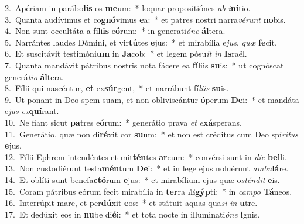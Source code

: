 {2.~}Apériam in parábo\textbf{lis} os \textbf{me}um:~* loquar propositiónes \textit{ab} \textit{i}\textbf{ní}tio.\\
{3.~}Quanta audívimus et co\textbf{gnó}vimus \textbf{e}a:~* et patres nostri narra\textit{vé}\textit{runt} \textbf{no}bis.\\
{4.~}Non sunt occultáta a fíli\textbf{is} e\textbf{ó}rum:~* in generati\textit{ó}\textit{ne} \textbf{ál}tera.\\
{5.~}Narrántes laudes Dómini, et vir\textbf{tú}tes \textbf{e}jus:~* et mirabília e\textit{jus}, \textit{quæ} \textbf{fe}cit.\\
{6.~}Et suscitávit testimóni\textbf{um} in \textbf{Ja}cob:~* et legem pósu\textit{it} \textit{in} \textbf{Is}raël.\\
{7.~}Quanta mandávit pátribus nostris nota fácere ea \textbf{fí}liis \textbf{su}is:~* ut cognóscat generá\textit{ti}\textit{o} \textbf{ál}tera.\\
{8.~}Fílii qui nascéntur, \textbf{et} ex\textbf{súr}gent,~* et narrábunt fí\textit{li}\textit{is} \textbf{su}is.\\
{9.~}Ut ponant in Deo spem suam, et non obliviscántur \textbf{ó}perum \textbf{De}i:~* et mandáta e\textit{jus} \textit{ex}\textbf{quí}rant.\\
{10.~}Ne fiant sicut \textbf{pa}tres e\textbf{ó}rum:~* generátio prava \textit{et} \textit{e}\textbf{xá}sperans.\\
{11.~}Generátio, quæ non di\textbf{ré}xit cor \textbf{su}um:~* et non est créditus cum Deo spí\textit{ri}\textit{tus} \textbf{e}jus.\\
{12.~}Fílii Ephrem intendéntes et mit\textbf{tén}tes \textbf{ar}cum:~* convérsi sunt in \textit{di}\textit{e} \textbf{bel}li.\\
{13.~}Non custodiérunt testa\textbf{mén}tum \textbf{De}i:~* et in lege ejus noluérunt \textit{am}\textit{bu}\textbf{lá}re.\\
{14.~}Et oblíti sunt benefa\textbf{ctó}rum \textbf{e}jus:~* et mirabílium ejus quæ o\textit{stén}\textit{dit} \textbf{e}is.\\
{15.~}Coram pátribus eórum fecit mirabília in \textbf{ter}ra Æ\textbf{gýp}ti:~* in \textit{cam}\textit{po} \textbf{Tá}neos.\\
{16.~}Interrúpit mare, et per\textbf{dú}xit \textbf{e}os:~* et státuit aquas qua\textit{si} \textit{in} \textbf{u}tre.\\
{17.~}Et dedúxit eos in \textbf{nu}be di\textbf{é}i:~* et tota nocte in illuminati\textit{ó}\textit{ne} \textbf{i}gnis.\\
